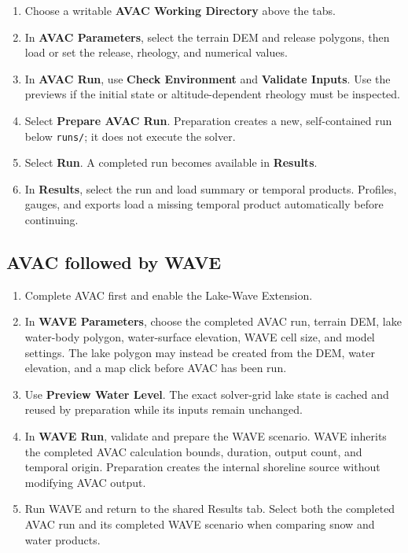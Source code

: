 \documentclass[11pt,a4paper]{article}
\newcommand{\control}[1]{\textbf{#1}}
\newcommand{\pathcode}[1]{\texttt{#1}}
\begin{document}
\begin{enumerate}
  \item Choose a writable \control{AVAC Working Directory} above the tabs.
  \item In \control{AVAC Parameters}, select the terrain DEM and release
        polygons, then load or set the release, rheology, and numerical values.
  \item In \control{AVAC Run}, use \control{Check Environment} and
        \control{Validate Inputs}. Use the previews if the initial state or
        altitude-dependent rheology must be inspected.
  \item Select \control{Prepare AVAC Run}. Preparation creates a new,
        self-contained run below \pathcode{runs/}; it does not execute the
        solver.
  \item Select \control{Run}. A completed run becomes available in
        \control{Results}.
  \item In \control{Results}, select the run and load summary or temporal
        products. Profiles, gauges, and exports load a missing temporal product
        automatically before continuing.
\end{enumerate}

\subsection{AVAC followed by WAVE}

\begin{enumerate}
  \item Complete AVAC first and enable the Lake-Wave Extension.
  \item In \control{WAVE Parameters}, choose the completed AVAC run, terrain
        DEM, lake water-body polygon, water-surface elevation, WAVE cell size,
        and model settings. The lake polygon may instead be created from the
        DEM, water elevation, and a map click before AVAC has been run.
  \item Use \control{Preview Water Level}. The exact solver-grid lake state is
        cached and reused by preparation while its inputs remain unchanged.
  \item In \control{WAVE Run}, validate and prepare the WAVE scenario. WAVE
        inherits the completed AVAC calculation bounds, duration, output
        count, and temporal origin. Preparation creates the internal shoreline
        source without modifying AVAC output.
  \item Run WAVE and return to the shared Results tab. Select both the completed
        AVAC run and its completed WAVE scenario when comparing snow and water
        products.
\end{enumerate}
\end{document}
